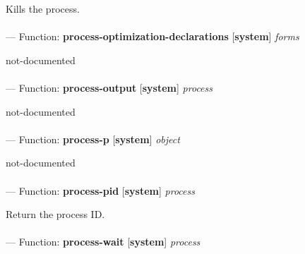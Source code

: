 \begin{adjustwidth}{5em}{5em}
Kills the process.
\end{adjustwidth}

\paragraph{}
\label{SYSTEM:PROCESS-OPTIMIZATION-DECLARATIONS}
--- Function: \textbf{process-optimization-declarations} [\textbf{system}] \textit{forms}

\begin{adjustwidth}{5em}{5em}
not-documented
\end{adjustwidth}

\paragraph{}
\label{SYSTEM:PROCESS-OUTPUT}
--- Function: \textbf{process-output} [\textbf{system}] \textit{process}

\begin{adjustwidth}{5em}{5em}
not-documented
\end{adjustwidth}

\paragraph{}
\label{SYSTEM:PROCESS-P}
--- Function: \textbf{process-p} [\textbf{system}] \textit{object}

\begin{adjustwidth}{5em}{5em}
not-documented
\end{adjustwidth}

\paragraph{}
\label{SYSTEM:PROCESS-PID}
--- Function: \textbf{process-pid} [\textbf{system}] \textit{process}

\begin{adjustwidth}{5em}{5em}
Return the process ID.
\end{adjustwidth}

\paragraph{}
\label{SYSTEM:PROCESS-WAIT}
--- Function: \textbf{process-wait} [\textbf{system}] \textit{process}

